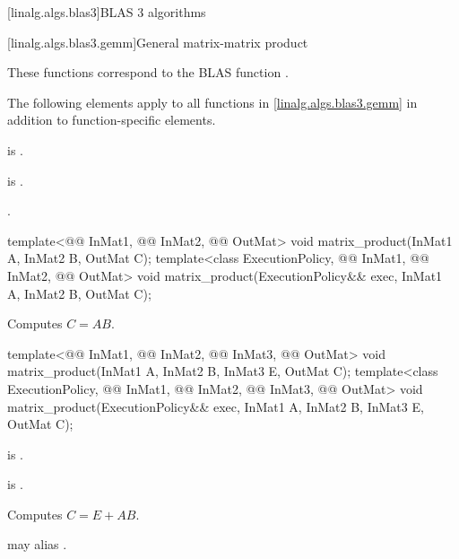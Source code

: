 [linalg.algs.blas3]{BLAS 3 algorithms}

[linalg.algs.blas3.gemm]{General matrix-matrix product}

\pnum
\begin{note}
These functions correspond to the BLAS function \supercite{blas3}.
\end{note}

\pnum
The following elements apply
to all functions in \ref{linalg.algs.blas3.gemm}
in addition to function-specific elements.

\pnum
\mandates
{}
is .

\pnum
\expects
{} is .

\pnum
\complexity
{}.

\begin{itemdecl}
  template<@@ InMat1, @@ InMat2, @@ OutMat>
    void matrix_product(InMat1 A, InMat2 B, OutMat C);
  template<class ExecutionPolicy, @@ InMat1, @@ InMat2, @@ OutMat>
    void matrix_product(ExecutionPolicy&& exec, InMat1 A, InMat2 B, OutMat C);
\end{itemdecl}

\begin{itemdescr}
\pnum
\effects
Computes $C = A B$.
\end{itemdescr}

\begin{itemdecl}
template<@@ InMat1, @@ InMat2, @@ InMat3, @@ OutMat>
  void matrix_product(InMat1 A, InMat2 B, InMat3 E, OutMat C);
template<class ExecutionPolicy,
         @@ InMat1, @@ InMat2, @@ InMat3, @@ OutMat>
  void matrix_product(ExecutionPolicy&& exec, InMat1 A, InMat2 B, InMat3 E, OutMat C);
\end{itemdecl}

\begin{itemdescr}
\pnum
\mandates
{} is .

\pnum
\expects
{} is .

\pnum
\effects
Computes $C = E + A B$.

\pnum
\remarks
{} may alias .
\end{itemdescr}

